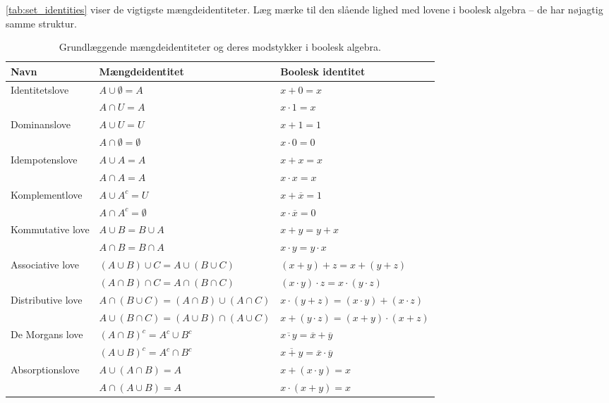\autoref{tab:set_identities} viser de vigtigste mængdeidentiteter. Læg mærke til den slående lighed med lovene i boolesk algebra -- de har nøjagtig samme struktur.

\begin{table}
\centering
\caption{Grundlæggende mængdeidentiteter og deres modstykker i boolesk algebra.}
\label{tab:set_identities}
\renewcommand{\arraystretch}{1.4}
\begin{tabular}{|l|l|l|}
\hline
\textbf{Navn} & \textbf{Mængdeidentitet} & \textbf{Boolesk identitet} \\
\hline
Identitetslove & $A \cup \emptyset = A$ & $x + 0 = x$ \\
& $A \cap U = A$ & $x \cdot 1 = x$ \\
\hline
Dominanslove & $A \cup U = U$ & $x + 1 = 1$ \\
& $A \cap \emptyset = \emptyset$ & $x \cdot 0 = 0$ \\
\hline
Idempotenslove & $A \cup A = A$ & $x + x = x$ \\
& $A \cap A = A$ & $x \cdot x = x$ \\
\hline
Komplementlove & $A \cup A^c = U$ & $x + \overline{x} = 1$ \\
& $A \cap A^c = \emptyset$ & $x \cdot \overline{x} = 0$ \\
\hline
Kommutative love & $A \cup B = B \cup A$ & $x + y = y + x$ \\
& $A \cap B = B \cap A$ & $x \cdot y = y \cdot x$ \\
\hline
Associative love & $(A \cup B) \cup C = A \cup (B \cup C)$ & $(x+y)+z = x+(y+z)$ \\
& $(A \cap B) \cap C = A \cap (B \cap C)$ & $(x \cdot y) \cdot z = x \cdot (y \cdot z)$ \\
\hline
Distributive love & $A \cap (B \cup C) = (A \cap B) \cup (A \cap C)$ & $x \cdot (y+z) = (x \cdot y)+(x \cdot z)$ \\
& $A \cup (B \cap C) = (A \cup B) \cap (A \cup C)$ & $x + (y \cdot z) = (x+y) \cdot (x+z)$ \\
\hline
De Morgans love & $(A \cap B)^c = A^c \cup B^c$ & $\overline{x \cdot y} = \overline{x} + \overline{y}$ \\
& $(A \cup B)^c = A^c \cap B^c$ & $\overline{x + y} = \overline{x} \cdot \overline{y}$ \\
\hline
Absorptionslove & $A \cup (A \cap B) = A$ & $x + (x \cdot y) = x$ \\
& $A \cap (A \cup B) = A$ & $x \cdot (x+y) = x$ \\
\hline
\end{tabular}
\end{table}

